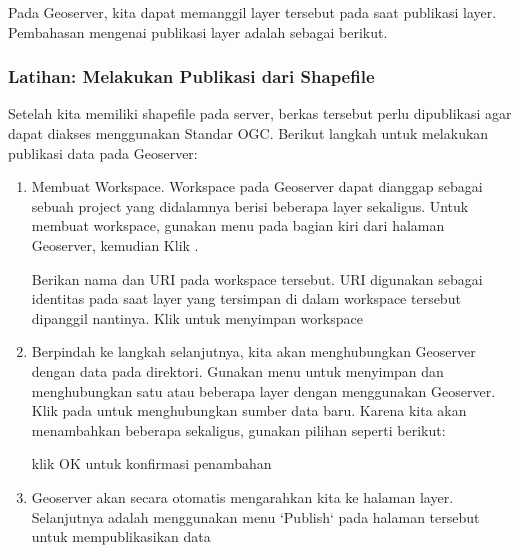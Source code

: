 \documentclass[letterpaper,10pt,english]{sphinxmanual}
\begin{document}
Pada Geoserver, kita dapat memanggil layer tersebut pada saat publikasi layer. Pembahasan mengenai publikasi layer adalah sebagai berikut.


\subsubsection{Latihan: Melakukan Publikasi dari Shapefile}
\label{\detokenize{sesi3/publikasi:latihan-melakukan-publikasi-dari-shapefile}}
Setelah kita memiliki shapefile pada server, berkas tersebut perlu dipublikasi agar dapat diakses menggunakan Standar OGC. Berikut langkah untuk melakukan publikasi data pada Geoserver:
\begin{enumerate}
%
\item {} 
Membuat Workspace. Workspace pada Geoserver dapat dianggap sebagai sebuah project yang didalamnya berisi beberapa layer sekaligus. Untuk membuat workspace, gunakan menu  pada bagian kiri dari halaman Geoserver, kemudian Klik .


Berikan nama dan URI pada workspace tersebut. URI digunakan sebagai identitas pada saat layer yang tersimpan di dalam workspace tersebut dipanggil nantinya. Klik  untuk menyimpan workspace

\item {} 
Berpindah ke langkah selanjutnya, kita akan menghubungkan Geoserver dengan data pada direktori. Gunakan menu  untuk menyimpan dan menghubungkan satu atau beberapa layer dengan menggunakan Geoserver. Klik pada  untuk menghubungkan sumber data baru. Karena kita akan menambahkan beberapa  sekaligus, gunakan pilihan  seperti berikut:


klik OK untuk konfirmasi penambahan 

\item {} 
Geoserver akan secara otomatis mengarahkan kita ke halaman layer. Selanjutnya adalah menggunakan menu ‘Publish` pada halaman tersebut untuk mempublikasikan data



\end{enumerate}
\end{document}
